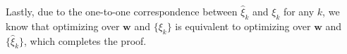 \documentclass[10pt,journal,compsoc]{newIEEEtran}
\newenvironment{proof}[1][Proof]{\begin{trivlist}
		\item[\hskip \labelsep {\bfseries #1}]}{\end{trivlist}}
\newcommand{\qed}{\nobreak \ifvmode \relax \else
	\ifdim\lastskip<1.5em \hskip-\lastskip
	\hskip1.5em plus0em minus0.5em \fi \nobreak
	\vrule height0.75em width0.5em depth0.25em\fi}
\begin{document}
\begin{proof}[Proof of Theorem \ref{THM:2COEQ}]
	Lastly, due to the one-to-one correspondence between $\hat{\xi}_k$ and $\xi_k$ for any $k$, we know that optimizing over $\mathbf{w}$ and $\{\xi_k\}$ is equivalent to optimizing over $\mathbf{w}$ and $\{\hat{\xi}_k\}$, which completes the proof. \qed
\end{proof}%


{
	
	
}
\end{document}
